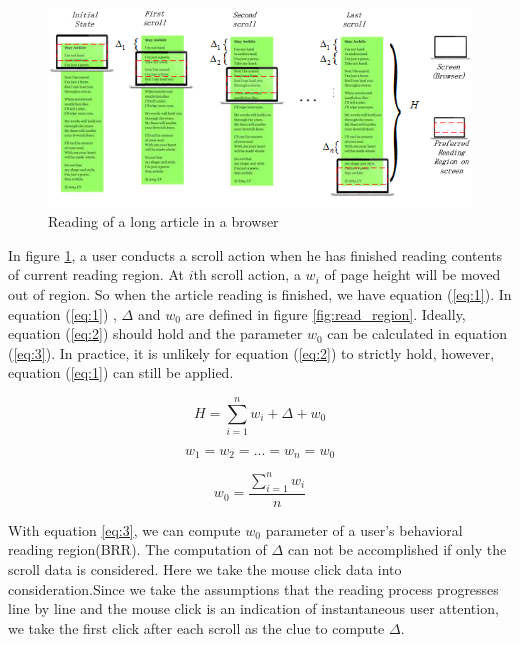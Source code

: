 \documentclass{sigchi}
\begin{document}
\begin{figure}[t]
\centering
\includegraphics[width=1.5\columnwidth]{pictures/scroll}
\caption{Reading of a long article in a browser}
\label{fig:scroll}
\end{figure}




In figure \ref{fig:scroll}, a user conducts a scroll action when he has finished reading contents of current reading region. 
At $i$th scroll action, a $w_i$ of page height will be moved out of region. So when the article reading is finished, 
we have equation (\ref{eq:1}). In equation (\ref{eq:1}) , $\Delta$ and $w_0$ are defined in figure 
\ref{fig:read_region}. Ideally, equation (\ref{eq:2}) should hold and the parameter $w_0$ can be 
calculated in equation (\ref{eq:3}). In practice, it is unlikely for equation (\ref{eq:2}) to strictly hold,
however, equation (\ref{eq:1}) can still be applied. 

\begin{equation} \label{eq:1}
	H = \sum\limits_{i = 1}^n {{w _i} + {\Delta } + w_0}  
\end{equation}

\begin{equation} \label{eq:2}
	{w _1} = {w_2} = ... = {w_n} = {w_0}
\end{equation}

\begin{equation} \label{eq:3}
	w_0 = \frac{{\sum\limits_{i = 1}^n {{w _i}} }}{n}
\end{equation}

With equation \ref{eq:3}, we can compute  $w_0$ parameter of a user's behavioral reading region(BRR). 
The computation of $\Delta$ can not be accomplished if only the scroll data is considered. Here we take
the mouse click data into consideration.Since we take the assumptions that the reading process progresses 
line by line and the mouse click is an indication of instantaneous user attention, we take the first click after each scroll as the clue to compute $\Delta$.
\end{document}
